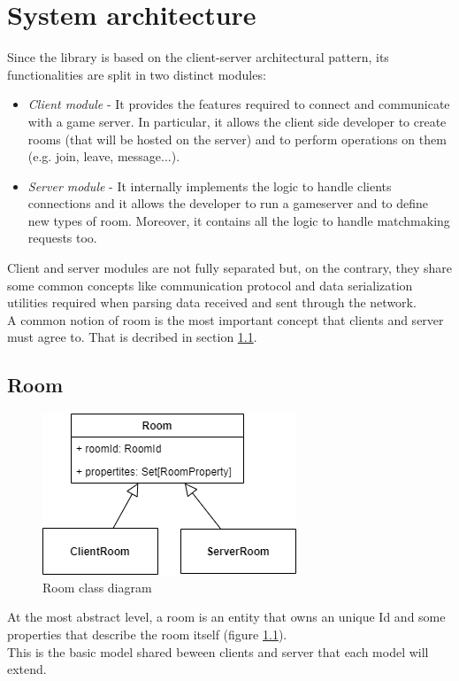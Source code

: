 \chapter{System architecture}
Since the library is based on the client-server architectural pattern, its functionalities are split in two distinct modules:
\begin{itemize}
	\item \textit{Client module} - It provides the features required to connect and communicate with a game server. In particular, it allows the client side developer to create rooms (that will be hosted on the server) and to perform operations on them (e.g. join, leave, message...).
	\item \textit{Server module} - It internally implements the logic to handle clients connections and it allows the developer to run a gameserver and to define new types of room. Moreover, it contains all the logic to handle matchmaking requests too.
\end{itemize}

Client and server modules are not fully separated but, on the contrary, they share some common concepts like communication protocol and data serialization utilities required when parsing data received and sent through the network.
\\
A common notion of room is the most important concept that clients and server must agree to. That is decribed in section \ref{room-arch}.

\section{Room} \label{room-arch}


\begin{figure}[H]
	\centering
	\includegraphics[scale=0.7]{images/3-architecture/room-class-3.png}
	\caption{Room class diagram}
	\label{fig:room_classes}
\end{figure}


At the most abstract level, a room is an entity that owns an unique Id and some properties that describe the room itself (figure \ref{fig:room_classes}).
\\
This is the basic model shared beween clients and server that each model will extend.

